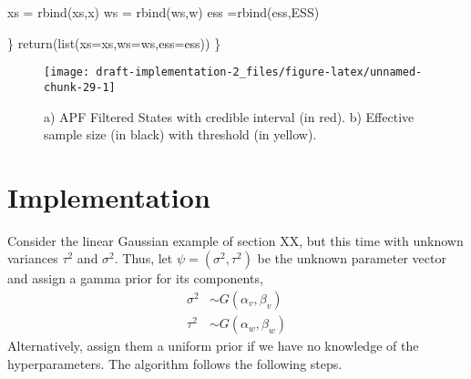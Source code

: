\documentclass[
]{article}
\newenvironment{Shaded}{\begin{snugshade}}{\end{snugshade}}
\newcommand{\AttributeTok}[1]{\textcolor[rgb]{0.77,0.63,0.00}{#1}}
\newcommand{\FunctionTok}[1]{\textcolor[rgb]{0.00,0.00,0.00}{#1}}
\newcommand{\NormalTok}[1]{#1}
\newcommand{\OtherTok}[1]{\textcolor[rgb]{0.56,0.35,0.01}{#1}}
\begin{document}
\begin{Shaded}
\begin{Highlighting}[]
    
\NormalTok{    xs }\OtherTok{=} \FunctionTok{rbind}\NormalTok{(xs,x)}
\NormalTok{    ws }\OtherTok{=} \FunctionTok{rbind}\NormalTok{(ws,w)}
\NormalTok{    ess }\OtherTok{=}\FunctionTok{rbind}\NormalTok{(ess,ESS)}
    
\NormalTok{  \}}
  \FunctionTok{return}\NormalTok{(}\FunctionTok{list}\NormalTok{(}\AttributeTok{xs=}\NormalTok{xs,}\AttributeTok{ws=}\NormalTok{ws,}\AttributeTok{ess=}\NormalTok{ess))}
\NormalTok{\}}
\end{Highlighting}
\end{Shaded}

\begin{figure}[ht]

{\centering \texttt{[image: draft-implementation-2\_files/figure-latex/unnamed-chunk-29-1]} 

}

\caption{a) APF Filtered States with credible interval (in red). b) Effective sample size (in black) with threshold (in yellow).}\label{fig:unnamed-chunk-29}
\end{figure}

\hfill\break

\section{Implementation}

\hfill\break
Consider the linear Gaussian example of section XX, but this time with
unknown variances \(\tau^{2}\) and \(\sigma^{2}\). Thus, let
\(\psi=(\sigma^{2},\tau^{2})\) be the unknown parameter vector and
assign a gamma prior for its components, \begin{align*}
\sigma^{2}  & \sim G(\alpha_{v},\beta_{v}) \\
\tau^{2}  & \sim G(\alpha_{w},\beta_{w})
\end{align*} Alternatively, assign them a uniform prior if we have no
knowledge of the hyperparameters. The algorithm follows the following
steps.
\end{document}
